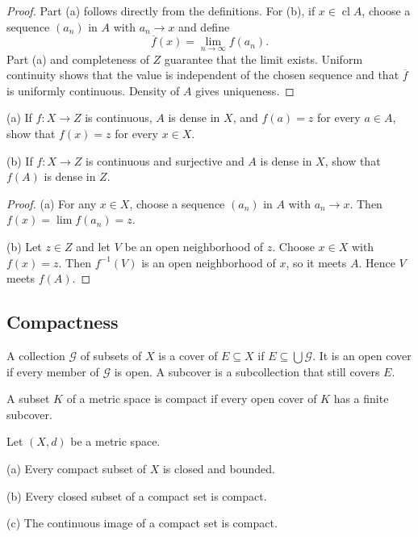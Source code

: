 \begin{proof}
Part (a) follows directly from the definitions. For (b), if
$x\in\operatorname{cl}A$, choose a sequence $(a_n)$ in $A$ with $a_n\to x$
and define
\[
\overline f(x)=\lim_{n\to\infty}f(a_n).
\]
Part (a) and completeness of $Z$ guarantee that the limit exists. Uniform
continuity shows that the value is independent of the chosen sequence and
that $\overline f$ is uniformly continuous. Density of $A$ gives uniqueness.
\end{proof}

\begin{ex}
(a) If $f:X\to Z$ is continuous, $A$ is dense in $X$, and $f(a)=z$ for every
$a\in A$, show that $f(x)=z$ for every $x\in X$.

(b) If $f:X\to Z$ is continuous and surjective and $A$ is dense in $X$, show
that $f(A)$ is dense in $Z$.
\end{ex}

\begin{proof}
(a) For any $x\in X$, choose a sequence $(a_n)$ in $A$ with $a_n\to x$.
Then $f(x)=\lim f(a_n)=z$.

(b) Let $z\in Z$ and let $V$ be an open neighborhood of $z$. Choose
$x\in X$ with $f(x)=z$. Then $f^{-1}(V)$ is an open neighborhood of $x$, so
it meets $A$. Hence $V$ meets $f(A)$.
\end{proof}

\subsection{Compactness}

\begin{de}
A collection $\mathcal{G}$ of subsets of $X$ is a cover of $E\subseteq X$ if
$E\subseteq\bigcup\mathcal{G}$. It is an open cover if every member of
$\mathcal{G}$ is open. A subcover is a subcollection that still covers $E$.

A subset $K$ of a metric space is compact if every open cover of $K$ has a
finite subcover.
\end{de}

\begin{thm}
Let $(X,d)$ be a metric space.

(a) Every compact subset of $X$ is closed and bounded.

(b) Every closed subset of a compact set is compact.

(c) The continuous image of a compact set is compact.
\end{thm}

